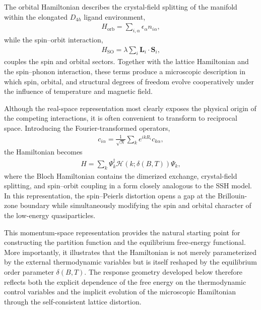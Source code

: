 The orbital Hamiltonian describes the crystal-field splitting of
the   manifold within the elongated
$D_{4h}$ ligand environment,
\begin{align}
H_{\mathrm{orb}}
=
\sum_{i,\alpha}
\epsilon_\alpha
n_{i\alpha},
\end{align}
while the spin–orbit interaction,
\begin{align}
H_{\mathrm{SO}}
=
\lambda
\sum_i
\mathbf{L}_i\cdot\mathbf{S}_i,
\end{align}
couples the spin and orbital sectors. Together with the lattice
Hamiltonian and the spin–phonon interaction, these terms
produce a microscopic description in which spin, orbital, and
structural degrees of freedom evolve cooperatively under the
influence of temperature and magnetic field.

Although the real-space representation most clearly exposes the
physical origin of the competing interactions, it is often
convenient to transform to reciprocal space. Introducing the
Fourier-transformed operators,
\begin{align}
c_{i\alpha}
=
\frac{1}{\sqrt{N}}
\sum_k
e^{ikR_i}
c_{k\alpha},
\end{align}
the Hamiltonian becomes
\begin{align}
H
=
\sum_k
\Psi_k^\dagger
\mathcal{H}(k;\delta(B,T))
\Psi_k,
\end{align}
where the Bloch Hamiltonian contains the dimerized exchange,
crystal-field splitting, and spin–orbit coupling in a form
closely analogous to the SSH model. In this representation, the
spin–Peierls distortion opens a gap at the Brillouin-zone
boundary while simultaneously modifying the spin and orbital
character of the low-energy quasiparticles.

This momentum-space representation provides the natural
starting point for constructing the partition function and the
equilibrium free-energy functional. More importantly, it
illustrates that the Hamiltonian is not merely parameterized by
the external thermodynamic variables but is itself reshaped by
the equilibrium order parameter \(\delta(B,T)\). The response
geometry developed below therefore reflects both the explicit
dependence of the free energy on the thermodynamic control
variables and the implicit evolution of the microscopic
Hamiltonian through the self-consistent lattice distortion.

